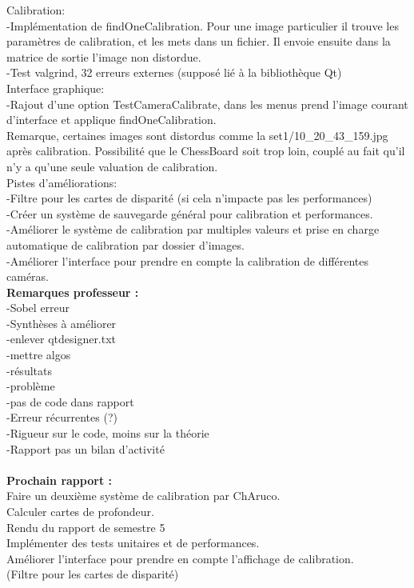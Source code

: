 \documentclass{article}
\begin{document}
Calibration:\\
    -Implémentation de findOneCalibration. Pour une image particulier il trouve les paramètres de calibration, et les mets dans un fichier. Il envoie ensuite dans la matrice de sortie l'image non distordue.\\
    -Test valgrind, 32 erreurs externes (supposé lié à la bibliothèque Qt)\\

Interface graphique:\\
    -Rajout d'une option TestCameraCalibrate, dans les menus prend l'image courant d'interface et applique findOneCalibration.\\
Remarque, certaines images sont distordus comme la set1/10\_20\_43\_159.jpg après calibration. Possibilité que le ChessBoard soit trop loin, couplé au fait qu'il n'y a qu'une seule valuation de calibration.
\\

Pistes d'améliorations:\\
    -Filtre pour les cartes de disparité (si cela n'impacte pas les performances)\\
    -Créer un système de sauvegarde général pour calibration et performances.\\
    -Améliorer le système de calibration par multiples valeurs et prise en charge automatique de calibration par dossier d'images.\\
    -Améliorer l'interface pour prendre en compte la calibration de différentes caméras.\\

\textbf{Remarques professeur :}\\
-Sobel erreur\\
-Synthèses à améliorer\\
-enlever qtdesigner.txt\\
-mettre algos\\
-résultats\\
-problème\\
-pas de code dans rapport\\
-Erreur récurrentes (?)\\
-Rigueur sur le code, moins sur la théorie\\
-Rapport pas un bilan d'activité\\
\\

\textbf{Prochain rapport :}\\
Faire un deuxième système de calibration par ChAruco.\\
Calculer cartes de profondeur.\\
Rendu du rapport de semestre 5\\
Implémenter des tests unitaires et de performances.\\
Améliorer l'interface pour prendre en compte l'affichage de calibration.\\
(Filtre pour les cartes de disparité)\\
\\\\
\end{document}
